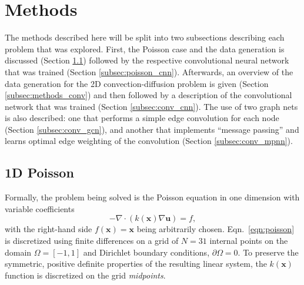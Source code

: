 \documentclass[review]{siamart190516}
\renewcommand{\vec}[1]{\bm{{#1}}}
\newcommand{\grad}{\nabla}
\begin{document}
\section{Methods}\label{sec:methods}

The methods described here will be split into two subsections describing each problem that was explored. First, the Poisson case and the data generation is discussed (Section \ref{subsec:methods_poisson}) followed by the respective convolutional neural network that was trained (Section \ref{subsec:poisson_cnn}).  Afterwards, an overview of the data generation for the 2D convection-diffusion problem is given (Section \ref{subsec:methods_conv}) and then followed by a description of the convolutional network that was trained (Section \ref{subsec:conv_cnn}).  The use of two graph nets is also described: one that performs a simple edge convolution for each node (Section \ref{subsec:conv_gcn}), and another that implements ``message passing'' and learns optimal edge weighting of the convolution (Section \ref{subsec:conv_mpnn}).

\subsection{1D Poisson}\label{subsec:methods_poisson}

Formally, the problem being solved is the Poisson equation in one dimension with variable coefficients
%
\begin{equation} \label{eqn:poisson}
  -\grad \cdot \left(k\left(\vec{x}\right) \grad\vec{u}\right) = f,
\end{equation}
%
with the right-hand side $f\left(\vec{x}\right)=\vec{x}$ being arbitrarily chosen.  Eqn.~\eqref{eqn:poisson} is discretized using finite differences on a grid of $N=31$ internal points on the domain $\Omega = \left[-1, 1\right]$ and Dirichlet boundary conditions, $\partial\Omega = 0$.  To preserve the symmetric, positive definite properties of the resulting linear system, the $k\left(\vec{x}\right)$ function is discretized on the grid \textit{midpoints}\cite{numpde}.
\end{document}
